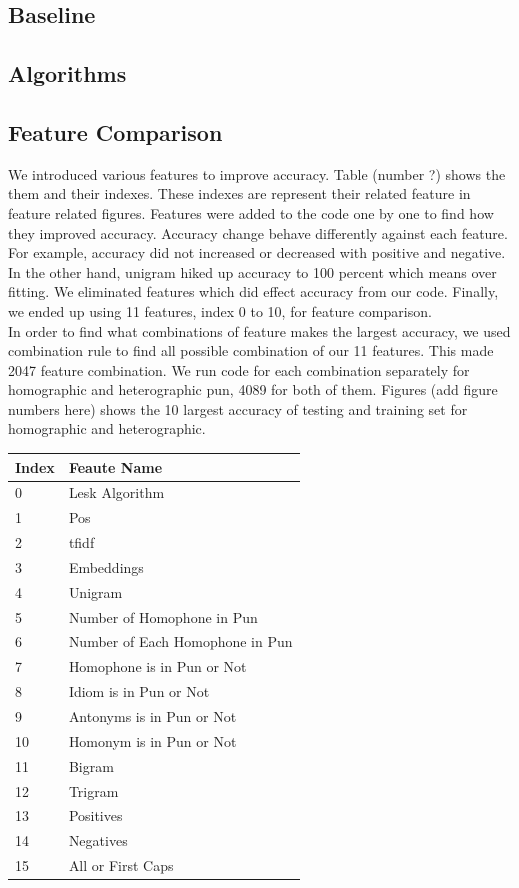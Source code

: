 \documentclass{article}
\begin{document}
\subsection{Baseline}

\subsection{Algorithms}

\subsection{Feature Comparison}
We introduced various features to improve accuracy. Table (number ?) shows the them and their indexes. These indexes are represent their related feature in feature related figures. Features were added to the code one by one to find how they improved accuracy. Accuracy change behave differently against each feature. For example, accuracy did not increased or decreased with positive and negative. In the other hand, unigram hiked up accuracy to 100 percent which means over fitting. We eliminated features which did effect accuracy from our code. Finally, we ended up using 11 features, index 0 to 10, for feature comparison.\\

In order to find what combinations of feature makes the largest accuracy, we used combination rule to find all possible combination of our 11 features. This made 2047 feature combination. We run code for each combination separately for homographic and heterographic pun, 4089 for both of them. Figures (add figure numbers here) shows the 10 largest accuracy of testing and training set for homographic and heterographic.\\



\begin{center}
\begin{tabular}{l l} 
\toprule
\textbf{Index} 	&	\textbf{Feaute Name}	\\
\midrule
0	&	Lesk Algorithm	\\
1	&	Pos	\\
2	&	tfidf	\\
3	&	Embeddings	\\
4	&	Unigram	\\
5	&	Number of Homophone in Pun	\\
6	&	Number of Each Homophone in Pun	\\
7	&	Homophone is in Pun or Not	\\
8	&	Idiom is in Pun or Not	\\
9	&	Antonyms is in Pun or Not	\\
10	&	Homonym is in Pun or Not	\\
11	&	Bigram	\\
12	&	Trigram	\\
13	&	Positives	\\
14	&	Negatives	\\
15	&	All or First Caps	\\
\bottomrule
\end{tabular}
\end{center}
\end{document}
